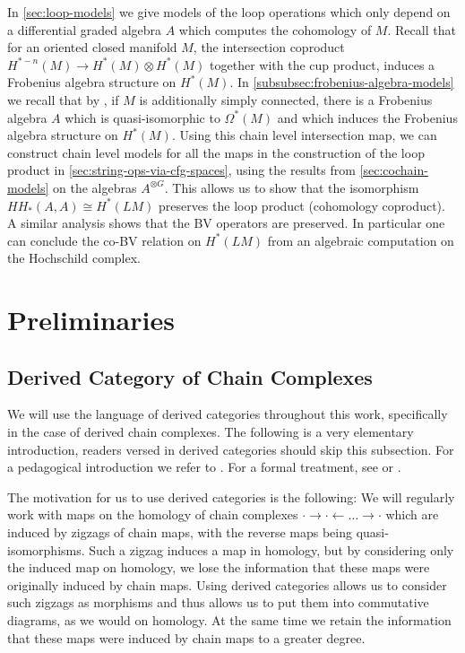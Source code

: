 \documentclass{scrartcl}
\theoremstyle{plain}
\theoremstyle{definition}
\newcommand{\iso}{\cong}
\newcommand{\from}{\leftarrow}
\begin{document}
In \cref{sec:loop-models} we give models of the loop operations which only depend on a differential graded algebra $A$ which computes the cohomology of $M$. Recall that for an oriented closed manifold $M$, the intersection coproduct $H^{*-n}(M)\to H^*(M)\otimes H^*(M)$ together with the cup product, induces a Frobenius algebra structure on $H^*(M)$. In \cref{subsubsec:frobenius-algebra-models} we recall that by \cite{lambrechts2008poincare}, if $M$ is additionally simply connected, there is a Frobenius algebra $A$ which is quasi-isomorphic to $\Omega^*(M)$ and which induces the Frobenius algebra structure on $H^*(M)$. Using this chain level intersection map, we can construct chain level models for all the maps in the construction of the loop product in \cref{sec:string-ops-via-cfg-spaces}, using the results from \cref{sec:cochain-models} on the algebras $A^{\otimes G}$. This allows us to show that the isomorphism $HH_*(A, A)\iso H^*(LM)$ preserves the loop product (cohomology coproduct). A similar analysis shows that the BV operators are preserved. In particular one can conclude the co-BV relation on $H^*(LM)$ from an algebraic computation on the Hochschild complex. 


\section{Preliminaries}

\subsection{Derived Category of Chain Complexes}\label{subsec:derived}

We will use the language of derived categories throughout this work, specifically in the case of derived chain complexes. The following is a very elementary introduction, readers versed in derived categories should skip this subsection. For a pedagogical introduction we refer to \cite{thomas2001derived}. For a formal treatment, see \cite{gelfand2013methods} or \cite{weibel1994introduction}. 

The motivation for us to use derived categories is the following: We will regularly work with maps on the homology of chain complexes $\cdot\to\cdot\from\dots\to\cdot$ which are induced by zigzags of chain maps, with the reverse maps being quasi-isomorphisms. Such a zigzag induces a map in homology, but by considering only the induced map on homology, we lose the information that these maps were originally induced by chain maps. Using derived categories allows us to consider such zigzags as morphisms and thus allows us to put them into commutative diagrams, as we would on homology. At the same time we retain the information that these maps were induced by chain maps to a greater degree.
\end{document}
